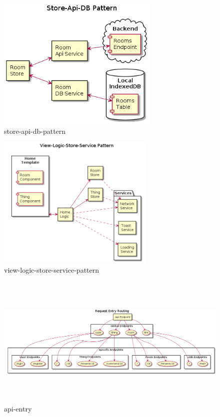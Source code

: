 \begin{figure}[hbt!]
\centering
\includegraphics[height=2.5in]{figures/diagrams/front/architecture/store-api-db-pattern.png}
\caption[store-api-db-pattern]{store-api-db-pattern\footnotemark}
\end{figure}

\begin{figure}[hbt!]
\centering
\includegraphics[height=2.5in]{figures/diagrams/front/architecture/view-logic-store-service-pattern.png}
\caption[view-logic-store-service-pattern]{view-logic-store-service-pattern\footnotemark}
\end{figure}

\begin{figure}[hbt!]
\centering
\includegraphics[height=2.5in]{figures/diagrams/back/router-flow/api-entry.png}
\caption[api-entry]{api-entry\footnotemark}
\end{figure}

